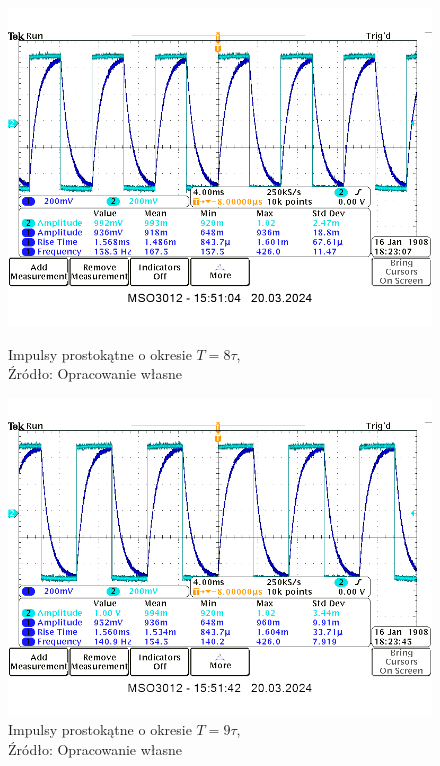 \documentclass{article}
\begin{document}
    \begin{figure}[!ht]
      \centering
      \begin{minipage}{.4\textwidth}
        \centering
        \includegraphics[scale=0.3]{grafiki/8t.png}
        \caption{Impulsy prostokątne o okresie $T = 8 \tau$,
          \\Źródło: Opracowanie własne}
      \end{minipage}
      \begin{minipage}{.4\textwidth}
        \centering
        \includegraphics[scale=0.23]{grafiki/9t.png}
        \caption{Impulsy prostokątne o okresie $T = 9 \tau$,
        \\Źródło: Opracowanie własne}
      \end{minipage}
    \end{figure}
\end{document}
